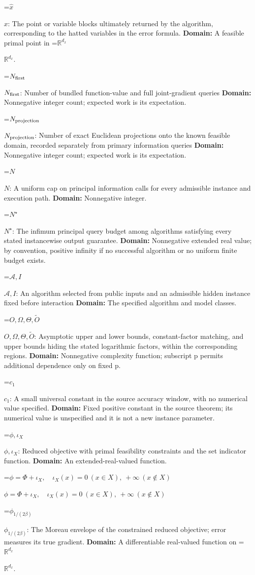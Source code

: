 \documentclass[10pt,a4paper]{article}
\newcommand{\AtlasMath}[1]{\par\begingroup\centering\setbox0=\hbox{$\displaystyle #1$}\ifdim\wd0>1.4\linewidth\typeout{ATLAS WIDE FORMULA: \the\wd0}\fi\ifdim\wd0>\linewidth\resizebox{\linewidth}{!}{\box0}\else\box0\fi\par\endgroup}
\newcommand{\AtlasInlineMath}[1]{\begingroup\setbox0=\hbox{$#1$}\ifdim\wd0>.4\linewidth\endgroup\AtlasMath{#1}\else\endgroup$#1$\fi}
\begin{document}
\AtlasInlineMath{\widehat x}: The point or variable blocks ultimately returned by the algorithm, corresponding to the hatted variables in the error formula. \textbf{Domain:} A feasible primal point in \AtlasInlineMath{\mathbb R^{d_x}}.

\AtlasInlineMath{N_{\rm first}}: Number of bundled function-value and full joint-gradient queries \textbf{Domain:} Nonnegative integer count; expected work is its expectation.

\AtlasInlineMath{N_{\rm projection}}: Number of exact Euclidean projections onto the known feasible domain, recorded separately from primary information queries \textbf{Domain:} Nonnegative integer count; expected work is its expectation.

\AtlasInlineMath{N}: A uniform cap on principal information calls for every admissible instance and execution path. \textbf{Domain:} Nonnegative integer.

\AtlasInlineMath{N^\star}: The infimum principal query budget among algorithms satisfying every stated instancewise output guarantee. \textbf{Domain:} Nonnegative extended real value; by convention, positive infinity if no successful algorithm or no uniform finite budget exists.

\AtlasInlineMath{\mathcal A,I}: An algorithm selected from public inputs and an admissible hidden instance fixed before interaction \textbf{Domain:} The specified algorithm and model classes.

\AtlasInlineMath{O,\Omega,\Theta,\widetilde O}: Asymptotic upper and lower bounds, constant-factor matching, and upper bounds hiding the stated logarithmic factors, within the corresponding regions. \textbf{Domain:} Nonnegative complexity function; subscript p permits additional dependence only on fixed p.

\AtlasInlineMath{c_1}: A small universal constant in the source accuracy window, with no numerical value specified. \textbf{Domain:} Fixed positive constant in the source theorem; its numerical value is unspecified and it is not a new instance parameter.

\AtlasInlineMath{\phi,\iota_X}: Reduced objective with primal feasibility constraints and the set indicator function. \textbf{Domain:} An extended-real-valued function.

\AtlasInlineMath{\phi=\Phi+\iota_X,\quad\iota_X(x)=0\ (x\in X),\ +\infty\ (x\notin X)}

\AtlasInlineMath{\phi_{1/(2\beta)}}: The Moreau envelope of the constrained reduced objective; error measures its true gradient. \textbf{Domain:} A differentiable real-valued function on \AtlasInlineMath{\mathbb R^{d_x}}.
\end{document}
